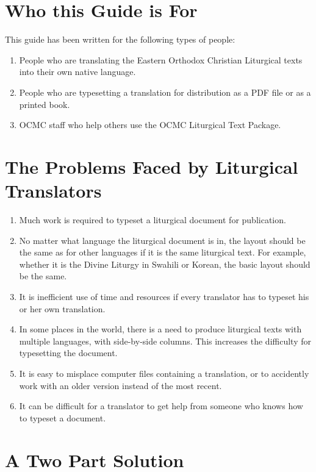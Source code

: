 \documentclass[]{memoir}
\begin{document}
\section{Who this Guide is For}
This guide has been written for the following types of people:
\begin{enumerate}
    \item People who are translating the Eastern Orthodox Christian Liturgical texts into their own native language.
    \item People who are typesetting a translation for distribution as a PDF file or as a printed book.
    \item OCMC staff who help others use the OCMC Liturgical Text Package.
\end{enumerate}
\section{The Problems Faced by Liturgical Translators}
\begin{enumerate}
    \item Much work is required to typeset a liturgical document for publication.
    \item No matter what language the liturgical document is in, the layout should be the same as for other languages if it is the same liturgical text.  For example, whether it is the Divine Liturgy in Swahili or Korean, the basic layout should be the same.
    \item It is inefficient use of time and resources if every translator has to typeset his or her own translation.
    \item In some places in the world, there is a need to produce liturgical texts with multiple languages, with side-by-side columns.  This increases the difficulty for typesetting the document.
    \item It is easy to misplace computer files containing a translation, or to accidently work with an older version instead of the most recent.
    \item It can be difficult for a translator to get help from someone who knows how to typeset a document.
\end{enumerate}
\section{A Two Part Solution}
\end{document}
